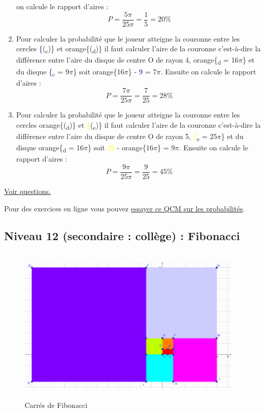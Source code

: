 \documentclass[11pt]{article}
\begin{document}
\begin{enumerate}
on calcule le rapport d'aires : \[P = \frac{5\pi}{25\pi} =
   \frac{1}{5} = 20\%\]
\item Pour calculer la probabilité que le joueur atteigne la couronne
entre les cercles \textcolor{navy}\{(\textsubscript{c})\} et
orange\{(\textsubscript{d})\} il faut calculer l'aire de la
couronne c'est-à-dire la différence entre l'aire du disque de
centre O de rayon 4, orange\{\textsubscript{d} = 16\(\pi\)\} et
du disque \textcolor{navy}\{\textsubscript{c} = 9\(\pi\)\} soit
orange\{16\(\pi\)\} - \textcolor{navy}{9\pi} =
7\(\pi\). Ensuite on calcule le rapport d'aires : \[P =
   \frac{7\pi}{25\pi} = \frac{7}{25} = 28\%\]
\item Pour calculer la probabilité que le joueur atteigne la couronne
entre les cercles orange\{(\textsubscript{d})\} et
\textcolor{yellow}\{(\textsubscript{e})\}  il faut calculer l'aire de
la couronne c'est-à-dire la différence entre l'aire du disque de
centre O de rayon 5, \textcolor{yellow}\{\textsubscript{e} = 25\(\pi\)\} et
du disque orange\{\textsubscript{d} = 16\(\pi\)\} soit
\textcolor{yellow}{25\pi} - orange\{16\(\pi\)\} =
9\(\pi\). Ensuite on calcule le rapport d'aires : \[P =
   \frac{9\pi}{25\pi} = \frac{9}{25} = 45\%\]
\end{enumerate}


\hyperref[orgbadc756]{Voir questions.}

Pour des exercices en ligne vous pouvez \href{https://didaskalosmanthanon.github.io/qcm-proba/}{essayer ce QCM sur les probabilités}.

\newpage


\subsection{Niveau 12 (secondaire : collège) : Fibonacci}
\label{sec:orgfc9339a}

\label{org629097b}

\begin{figure}[htbp]
\centering
\includegraphics[width=0.95\textwidth,height=7.5cm]{./images/fibonacci-square.png}
\caption{Carrés de Fibonacci}
\end{figure}
\label{orgfb1884a}
\end{document}
